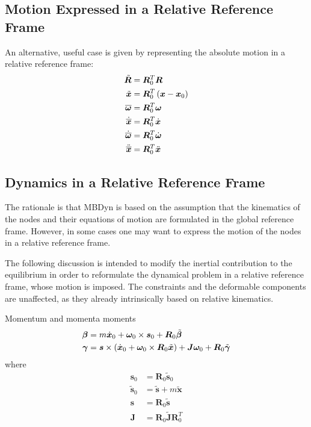 \documentclass[10pt,dvips,fleqn,subeqn]{report}
\newcommand{\T}[1]{\bm{#1}}
\newcommand{\TT}[1]{\bm{#1}}
\begin{document}
\subsection{Motion Expressed in a Relative Reference Frame}
\label{sec:nodes:structural nodes:relative frame motion}
An alternative, useful case is given by representing the absolute motion
in a relative reference frame:
\begin{subequations}
\begin{align}
	\tilde{\TT{R}} &= \TT{R}_0^T \TT{R} \\
	\tilde{\T{x}} &= \TT{R}_0^T\plbr{\T{x} - \T{x}_0} \\
	\overline{\T{\omega}} &= \TT{R}_0^T \T{\omega} \\
	\dot{\overline{\T{x}}} &= \TT{R}_0^T \dot{\T{x}} \\
	\dot{\overline{\T{\omega}}} &= \TT{R}_0^T \dot{\T{\omega}} \\
	\ddot{\overline{\T{x}}} &= \TT{R}_0^T \ddot{\T{x}}
\end{align}
\end{subequations}


\subsection{Dynamics in a Relative Reference Frame}
\label{sec:nodes:structural nodes:relative frame dynamics}
The rationale is that MBDyn is based on the assumption
that the kinematics of the nodes and their equations of motion
are formulated in the global reference frame.
However, in some cases one may want to express the motion
of the nodes in a relative reference frame.

The following discussion is intended to modify the inertial contribution
to the equilibrium in order to reformulate the dynamical problem
in a relative reference frame, whose motion is imposed.
The constraints and the deformable components are unaffected,
as they already intrinsically based on relative kinematics.

Momentum and momenta moments
\begin{subequations}
\begin{align}
	\T{\beta}
	&= m \dot{\T{x}}_0
	+ \T{\omega}_0 \times \T{s}_0
	+ \TT{R}_0 \tilde{\T{\beta}} \\
	\T{\gamma}
	&= \T{s}\times\plbr{
		\dot{\T{x}}_0
		+ \T{\omega}_0 \times \TT{R}_0 \tilde{\T{x}}
	} + \TT{J} \T{\omega}_0
	+ \TT{R}_0 \tilde{\T{\gamma}}
\end{align}
\end{subequations}
where
\begin{align}
	\T{s}_0 &= \TT{R}_0 \tilde{\T{s}}_0 \\
	\tilde{\T{s}}_0 &= \tilde{\T{s}} + m \tilde{\T{x}} \\
	\T{s} &= \TT{R}_0 \tilde{\T{s}} \\
	\TT{J} &= \TT{R}_0 \tilde{\TT{J}} \TT{R}_0^T
\end{align}
\end{document}
